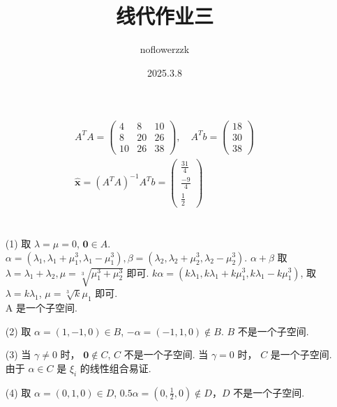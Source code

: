 \documentclass{article}
\title{线代作业三}
\author{noflowerzzk}
\date{2025.3.8}
\begin{document}
\maketitle

\section{}

\begin{align*}
    A^TA = \begin{pmatrix}
        4 & 8 & 10 \\
        8 & 20 & 26 \\
        10 & 26 & 38
    \end{pmatrix}, \quad
    A^Tb = \begin{pmatrix}
        18 \\ 30 \\ 38
    \end{pmatrix} \\
    \hat{\boldsymbol{x}} = (A^TA)^{-1}A^Tb = \begin{pmatrix}
        \frac{31}{4} \\ \frac{-9}{4} \\ \frac{1}{2}
    \end{pmatrix}
\end{align*}

\section{}

\begin{itemize}
    \item [(1)] 取 $\lambda = \mu = 0$, $\boldsymbol{0} \in A$. \\
    $\alpha = (\lambda_1, \lambda_1 + \mu_1^3, \lambda_1 - \mu_1^3 ), \beta = (\lambda_2, \lambda_2 + \mu_2^3, \lambda_2 - \mu_2^3)$. $\alpha + \beta$ 取 $\lambda = \lambda_1 + \lambda_2, \mu = \sqrt[3]{\mu_1^3 + \mu_2^3}$ 即可. $k\alpha = (k\lambda_1, k\lambda_1 + k\mu_1^3, k\lambda_1 - k\mu_1^3 )$, 取 $\lambda = k\lambda_1$, $\mu = \sqrt[3]{k}\mu_1$ 即可. \\ A 是一个子空间.
    \item [(2)] 取 $\alpha = (1, -1, 0) \in B$, $-\alpha = (-1, 1, 0) \notin B$. $B$ 不是一个子空间.
    \item [(3)] 当 $\gamma \neq 0$ 时， $\boldsymbol{0} \notin C$, $C$ 不是一个子空间. 当 $\gamma = 0$ 时， $C$ 是一个子空间. 由于 $\alpha \in C$ 是 $\xi_i$ 的线性组合易证.
    \item [(4)] 取 $\alpha = (0, 1, 0) \in D$, $0.5\alpha = \left(0, \frac{1}{2}, 0\right) \notin D$，$D$ 不是一个子空间.
\end{itemize}
\end{document}
